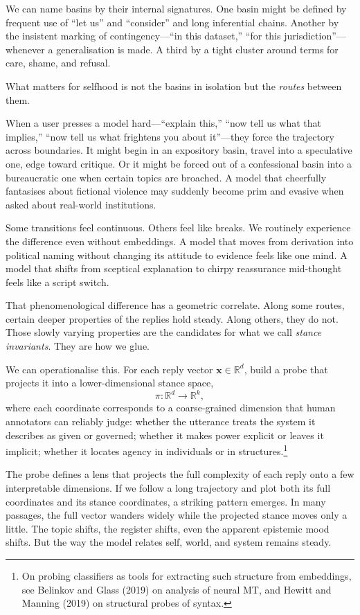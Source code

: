 \documentclass[12pt,a4paper]{article}
\begin{document}
We can name basins by their internal signatures. One basin might be defined by frequent use of ``let us'' and ``consider'' and long inferential chains. Another by the insistent marking of contingency---``in this dataset,'' ``for this jurisdiction''---whenever a generalisation is made. A third by a tight cluster around terms for care, shame, and refusal.

What matters for selfhood is not the basins in isolation but the \emph{routes} between them.

When a user presses a model hard---``explain this,'' ``now tell us what that implies,'' ``now tell us what frightens you about it''---they force the trajectory across boundaries. It might begin in an expository basin, travel into a speculative one, edge toward critique. Or it might be forced out of a confessional basin into a bureaucratic one when certain topics are broached. A model that cheerfully fantasises about fictional violence may suddenly become prim and evasive when asked about real-world institutions.

Some transitions feel continuous. Others feel like breaks. We routinely experience the difference even without embeddings. A model that moves from derivation into political naming without changing its attitude to evidence feels like one mind. A model that shifts from sceptical explanation to chirpy reassurance mid-thought feels like a script switch.

That phenomenological difference has a geometric correlate. Along some routes, certain deeper properties of the replies hold steady. Along others, they do not. Those slowly varying properties are the candidates for what we call \emph{stance invariants}. They are how we glue.

We can operationalise this. For each reply vector $\mathbf{x} \in \mathbb{R}^d$, build a probe that projects it into a lower-dimensional stance space,
\[
\pi: \mathbb{R}^d \to \mathbb{R}^k,
\]
where each coordinate corresponds to a coarse-grained dimension that human annotators can reliably judge: whether the utterance treats the system it describes as given or governed; whether it makes power explicit or leaves it implicit; whether it locates agency in individuals or in structures.\footnote{On probing classifiers as tools for extracting such structure from embeddings, see Belinkov and Glass (2019) on analysis of neural MT, and Hewitt and Manning (2019) on structural probes of syntax.}

The probe defines a lens that projects the full complexity of each reply onto a few interpretable dimensions. If we follow a long trajectory and plot both its full coordinates and its stance coordinates, a striking pattern emerges. In many passages, the full vector wanders widely while the projected stance moves only a little. The topic shifts, the register shifts, even the apparent epistemic mood shifts. But the way the model relates self, world, and system remains steady.
\end{document}
